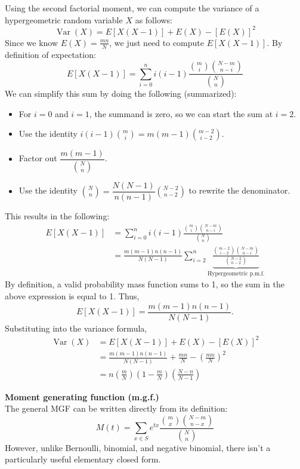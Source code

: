 ﻿\documentclass[12pt]{article}
\begin{document}
\begin{notebox}
    Using the second factorial moment, we can compute the variance of a hypergeometric random variable $X$ as follows:
\[\operatorname{Var}(X) = E[X(X-1)] + E(X) - [E(X)]^2\]
Since we know $E(X) = \frac{mn}{N}$, we just need to compute $E[X(X-1)]$. By definition of expectation:
\[
E[X(X-1)]=\sum_{i=0}^{n}i(i-1)\frac{\binom mi\binom{N-m}{n-i}}{\binom Nn}
\]
We can simplify this sum by doing the following (summarized):
\begin{itemize}
    \item For $i=0$ and $i=1$, the summand is zero, so we can start the sum at $i=2$.
    \item Use the identity
    $i(i-1)\binom{m}{i}=m(m-1)\binom{m-2}{i-2}$.
    \item Factor out $\dfrac{m(m-1)}{\binom{N}{n}}$.
    \item Use the identity
    $\binom{N}{n}=\dfrac{N(N-1)}{n(n-1)}\binom{N-2}{n-2}$
    to rewrite the denominator.
\end{itemize}
This results in the following:
\[
\begin{aligned}
E[X(X-1)]
&=\sum_{i=0}^{n}i(i-1)
\frac{\binom{m}{i}\binom{N-m}{n-i}}{\binom{N}{n}}\\[6pt]
&=\frac{m(m-1)n(n-1)}{N(N-1)}
\sum_{i=2}^{n}
\underbrace{
\frac{\binom{m-2}{i-2}\binom{N-m}{n-i}}
{\binom{N-2}{n-2}}
}_{\text{Hypergeometric p.m.f.}}
\end{aligned}
\]
By definition, a valid probability mass function sums to 1, so the sum in the above expression is equal to 1. Thus,
\[
E[X(X-1)]=\frac{m(m-1)n(n-1)}{N(N-1)}.
\]
Substituting into the variance formula,
\[
\begin{aligned}
\operatorname{Var}(X)
&=E[X(X-1)]+E(X)-[E(X)]^2\\[6pt]
&=\frac{m(m-1)n(n-1)}{N(N-1)}
+\frac{mn}{N}-\left(\frac{mn}{N}\right)^2\\[6pt]
&=n\left(\frac{m}{N}\right)
\left(1-\frac{m}{N}\right)
\left(\frac{N-n}{N-1}\right)
\end{aligned}
\]
\end{notebox}
\textbf{Moment generating function (m.g.f.)}\\
The general MGF can be written directly from its definition:
\[
M(t)=\sum_{x\in S} e^{tx}\frac{\binom mx\binom{N-m}{n-x}}{\binom Nn}
\]
However, unlike Bernoulli, binomial, and negative binomial, there isn't a particularly useful elementary closed form.
\end{document}
